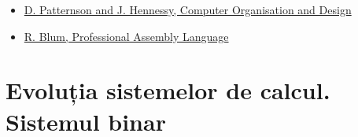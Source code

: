 \documentclass[a4paper,10pt]{article}
\begin{document}
\begin{itemize}
    \item \href{https://www.google.com/url?sa=t&rct=j&q=&esrc=s&source=web&cd=&cad=rja&uact=8&ved=2ahUKEwjt2ZXGo4CPAxW2SfEDHZXIFQ8QFnoECC8QAQ&url=https%3A%2F%2Fia601209.us.archive.org%2F24%2Fitems%2FComputerOrganizationAndDesign3rdEdition%2F-computer%2520organization%2520and%2520design%25203rd%2520edition.pdf&usg=AOvVaw1pgFBveFHAibz19Tz7R-6D&opi=89978449}{D. Patternson and J. Hennessy, Computer Organisation and Design}
    \item \href{https://www.google.com/url?sa=t&rct=j&q=&esrc=s&source=web&cd=&ved=2ahUKEwjv3JPjpICPAxWNQ_EDHc0gLvoQFnoECB0QAQ&url=https%3A%2F%2Farchive.org%2Fdownload%2FProfessional_Assembly_Language_2005%2FProfessional_Assembly_Language_2005.pdf&usg=AOvVaw3TJSBH1Y0pcpnMmrMsjSPH&opi=89978449}{R. Blum, Professional Assembly Language}
\end{itemize}

\section{Evoluția sistemelor de calcul. Sistemul binar}
\end{document}

